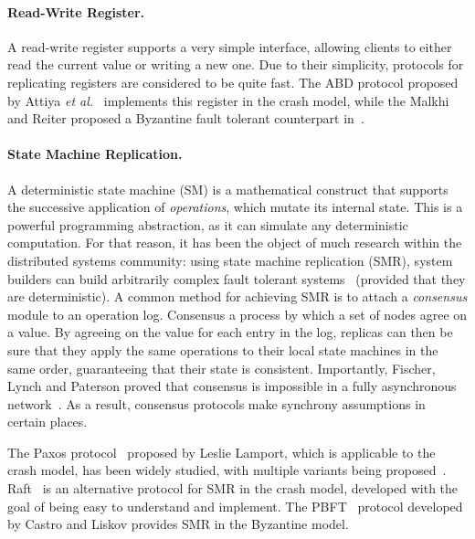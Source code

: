 \paragraph{Read-Write Register.} A read-write register supports a
very simple interface, allowing clients to either read the
current value or writing a new one. Due to their simplicity,
protocols for replicating registers are considered to be quite
fast. The ABD protocol proposed by Attiya
\emph{et al.}~\cite{abd} implements this register in the crash
model, while the Malkhi and Reiter proposed a Byzantine fault tolerant
counterpart in~\cite{bqs}.

\paragraph{State Machine Replication.} A deterministic state machine (SM) is a
mathematical construct that supports the successive application of
\emph{operations}, which mutate its internal state. This is a
powerful programming abstraction, as it can simulate any
deterministic computation. For that reason, it has been the
object of much research within the distributed systems community:
using state machine replication (SMR), system builders can build
arbitrarily complex fault tolerant systems~\cite{schneider-smr} (provided that they
are deterministic). A common method for achieving SMR is to
attach a \emph{consensus} module to an operation log. Consensus
a process by which a set of nodes agree on a value. By agreeing
on the value for each entry in the log, replicas can then be sure
that they apply the same operations to their local state machines in the same order,
guaranteeing that their state is consistent. Importantly,
Fischer, Lynch and Paterson proved that consensus is impossible
in a fully asynchronous network~\cite{flp}. As a result,
consensus protocols make synchrony assumptions in certain places.

The Paxos protocol~\cite{paxos} proposed by Leslie Lamport, which
is applicable to the crash model, has been widely studied, with
multiple variants being
proposed~\cite{fp,fast-paxos,egalitarian-paxos,disk-paxos,paxos_builders}.
Raft~\cite{raft} is an alternative protocol for SMR in the crash
model, developed with the goal of being easy to understand and
implement. The PBFT~\cite{pbft} protocol developed by Castro and
Liskov provides SMR in the Byzantine model.


